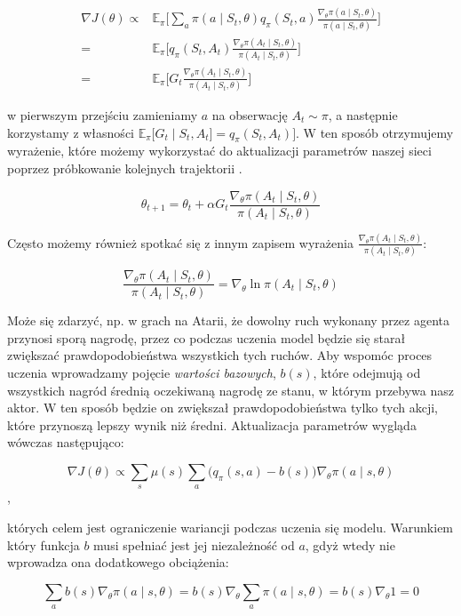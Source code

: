 \documentclass[licencjacka]{pracamgr}
\begin{document}
\begin{align*}
\nabla J(\theta) \propto  & \mathbb{E}_\pi \Bigg[ \sum_{a} \pi(a \mid S_t, \theta) q_\pi (S_t, a) \frac{\nabla_\theta \pi(a \mid S_t, \theta)}{\pi(a \mid S_t, \theta)} \Bigg] \\
= & \mathbb{E}_\pi \Bigg[ q_\pi(S_t, A_t) \frac{\nabla_\theta \pi(A_t \mid S_t, \theta)}{\pi(A_t \mid S_t, \theta)} \Bigg] \\ 
= & \mathbb{E}_\pi \Bigg[ G_t \frac{\nabla_\theta \pi(A_t \mid S_t, \theta)}{\pi(A_t \mid S_t, \theta)} \Bigg] 
\end{align*}

w pierwszym przejściu zamieniamy $a$ na obserwację $A_t \sim \pi$, a następnie korzystamy z własności $ \mathbb{E}_\pi \big[ G_t \mid S_t, A_t \big] = q_\pi(S_t, A_t) \big] $. W ten sposób otrzymujemy wyrażenie, które możemy wykorzystać do aktualizacji parametrów naszej sieci poprzez próbkowanie kolejnych trajektorii .

$$ \theta_{t+1} = \theta_t + \alpha G_t \frac{\nabla_\theta \pi(A_t \mid S_t, \theta)}{\pi(A_t \mid S_t, \theta)} $$

Często możemy również spotkać się z innym zapisem wyrażenia $  \frac{\nabla_\theta \pi(A_t \mid S_t, \theta)}{\pi(A_t \mid S_t, \theta)}$:

$$  \frac{\nabla_\theta \pi(A_t \mid S_t, \theta)}{\pi(A_t \mid S_t, \theta)} = \nabla_\theta \ln \pi(A_t \mid S_t, \theta) $$

Może się zdarzyć, np. w grach na Atarii, że dowolny ruch wykonany przez agenta przynosi sporą nagrodę, przez co podczas uczenia model będzie się starał zwiększać prawdopodobieństwa wszystkich tych ruchów. Aby wspomóc proces uczenia wprowadzamy pojęcie \emph{wartości bazowych}, $b(s)$, które odejmują od wszystkich nagród średnią oczekiwaną nagrodę ze stanu, w którym przebywa nasz aktor. W ten sposób będzie on zwiększał prawdopodobieństwa tylko tych akcji, które przynoszą lepszy wynik niż średni. Aktualizacja parametrów wygląda wówczas następująco:

$$ \nabla J(\theta) \propto \sum_s \mu(s) \sum_a \Big( q_\pi(s, a) - b(s) \Big) \nabla_\theta \pi(a \mid s, \theta) $$,

których celem jest ograniczenie wariancji podczas uczenia się modelu. Warunkiem który funkcja $b$ musi spełniać jest jej niezależność od $a$, gdyż wtedy nie wprowadza ona dodatkowego obciążenia:

$$ \sum_a b(s) \nabla_\theta \pi(a \mid s, \theta) = b(s) \nabla_\theta \sum_a \pi(a \mid s, \theta) = b(s) \nabla_\theta 1 = 0 $$
\end{document}
